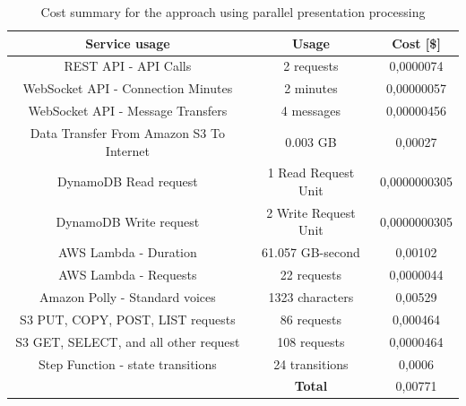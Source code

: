 \begin{table}[H]
    \centering
    \begin{tabular}{ |c|c|c| } 
    \hline
    Service usage & Usage & Cost [\$] \\
    \hline
    REST API - API Calls & 2 requests & 0,0000074 \\
    WebSocket API - Connection Minutes & 2 minutes & 0,00000057 \\
    WebSocket API - Message Transfers & 4 messages & 0,00000456 \\
    \hline
    Data Transfer From Amazon S3 To Internet & 0.003 GB & 0,00027 \\
    \hline
    DynamoDB Read request & 1 Read Request Unit & 0,0000000305 \\
    DynamoDB Write request & 2 Write Request Unit & 0,0000000305 \\
    \hline
    AWS Lambda - Duration & 61.057 GB-second & 0,00102 \\
    AWS Lambda - Requests & 22 requests & 0,0000044 \\
    \hline
    Amazon Polly - Standard voices & 1323 characters & 0,00529 \\
    \hline
    S3 PUT, COPY, POST, LIST requests & 86 requests & 0,000464 \\
    S3 GET, SELECT, and all other request & 108 requests & 0,0000464 \\
    \hline
    Step Function - state transitions & 24 transitions & 0,0006 \\
    \hline
    \multicolumn{1}{c|}{} & \textbf{Total} & 0,00771 \\
    \cline{2-3}
    \end{tabular}
    \caption{Cost summary for the approach using parallel presentation processing}
    \label{table:case-study-service-parallel-spending-summary}
\end{table}

